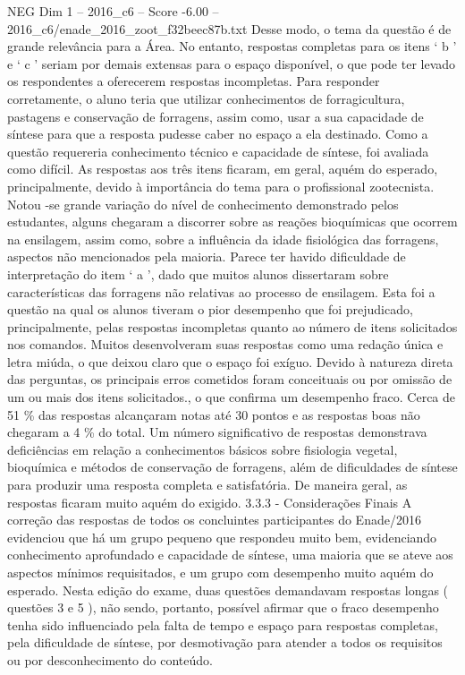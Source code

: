 \begin{textsample}{NEG Dim 1 – 2016\_c6 – Score -6.00 – 2016\_c6/enade\_2016\_zoot\_f32beec87b.txt}
Desse modo, o tema da questão é de grande relevância para a Área.
No entanto, respostas completas para os itens ‘ b ’ e ‘ c ’ seriam por demais extensas para o espaço disponível, o que pode ter levado os respondentes a oferecerem respostas incompletas.
Para responder corretamente, o aluno teria que utilizar conhecimentos de forragicultura, pastagens e conservação de forragens, assim como, usar a sua capacidade de síntese para que a resposta pudesse caber no espaço a ela destinado.
Como a questão requereria conhecimento técnico e capacidade de síntese, foi avaliada como difícil.
As respostas aos três itens ficaram, em geral, aquém do esperado, principalmente, devido à importância do tema para o profissional zootecnista.
Notou -se grande variação do nível de conhecimento demonstrado pelos estudantes, alguns chegaram a discorrer sobre as reações bioquímicas que ocorrem na ensilagem, assim como, sobre a influência da idade fisiológica das forragens, aspectos não mencionados pela maioria.
Parece ter havido dificuldade de interpretação do item ‘ a ’, dado que muitos alunos dissertaram sobre características das forragens não relativas ao processo de ensilagem.
Esta foi a questão na qual os alunos tiveram o pior desempenho que foi prejudicado, principalmente, pelas respostas incompletas quanto ao número de itens solicitados nos comandos.
Muitos desenvolveram suas respostas como uma redação única e letra miúda, o que deixou claro que o espaço foi exíguo.
Devido à natureza direta das perguntas, os principais erros cometidos foram conceituais ou por omissão de um ou mais dos itens solicitados., o que confirma um desempenho fraco.
Cerca de 51 \% das respostas alcançaram notas até 30 pontos e as respostas boas não chegaram a 4 \% do total.
Um número significativo de respostas demonstrava deficiências em relação a conhecimentos básicos sobre fisiologia vegetal, bioquímica e métodos de conservação de forragens, além de dificuldades de síntese para produzir uma resposta completa e satisfatória.
De maneira geral, as respostas ficaram muito aquém do exigido. 3.3.3 - Considerações Finais A correção das respostas de todos os concluintes participantes do Enade/2016 evidenciou que há um grupo pequeno que respondeu muito bem, evidenciando conhecimento aprofundado e capacidade de síntese, uma maioria que se ateve aos aspectos mínimos requisitados, e um grupo com desempenho muito aquém do esperado.
Nesta edição do exame, duas questões demandavam respostas longas ( questões 3 e 5 ), não sendo, portanto, possível afirmar que o fraco desempenho tenha sido influenciado pela falta de tempo e espaço para respostas completas, pela dificuldade de síntese, por desmotivação para atender a todos os requisitos ou por desconhecimento do conteúdo.

\end{textsample}

